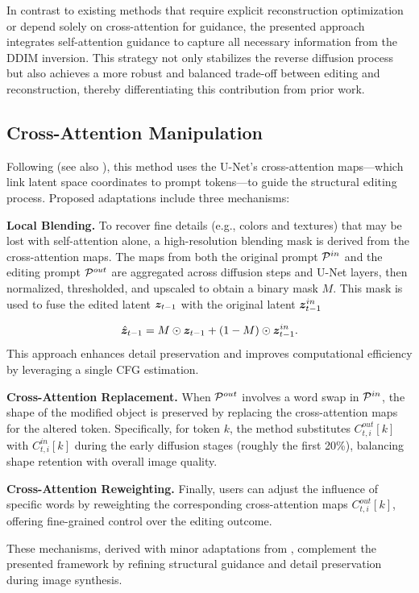 In contrast to existing methods that require explicit reconstruction optimization \cite{mokady2023null,miyake2023negative} or depend solely on cross-attention for guidance, {\modified{}the presented approach integrates} self-attention guidance to capture all necessary information from the DDIM inversion. This strategy not only stabilizes the reverse diffusion process but also achieves a more robust and balanced trade-off between editing and reconstruction, thereby differentiating {\modified{}this contribution} from prior work.




\subsection{Cross-Attention Manipulation}
\label{sec:cross_attention_manipulation}
Following \cite{hertz2023prompt} (see also \cite{mokady2023null,parmar2023zero,han2023proximal,ju2023direct,miyake2023negative}), {\modified{}this method uses} the U-Net’s cross-attention maps—which link latent space coordinates to prompt tokens—to guide the structural editing process. {\modified{}Proposed} adaptations include three mechanisms:


\textbf{Local Blending.} To recover fine details (e.g., colors and textures) that may be lost with self-attention alone, {\modified{}a high-resolution blending mask is derived} from the cross-attention maps. {\modified{}The maps from both the original prompt} ${{\mathcal{P}}^{in}}$ and the editing prompt ${{\mathcal{P}}^{out}}$ {\modified{}are aggregated} across diffusion steps and U-Net layers, then normalized, thresholded, and upscaled to obtain a binary mask $M$. This mask is used to fuse the edited latent ${\bm{z}}_{t-1}$ with the original latent ${\bm{z}}^{in}_{t-1}$

\begin{equation}
    \label{eq:local_blend}
    \hat{{\bm{z}}}_{t-1} = M \odot {\bm{z}}_{t-1} + (1-M) \odot {\bm{z}}^{in}_{t-1}.
\end{equation}
This approach enhances detail preservation and improves computational efficiency by leveraging a single CFG estimation.

\textbf{Cross-Attention Replacement.} When ${{\mathcal{P}}^{out}}$ involves a word swap in ${{\mathcal{P}}^{in}}$, {\modified{}the shape of the modified object is preserved} by replacing the cross-attention maps for the altered token. Specifically, for token $k$, {\modified{}the method substitutes} $C_{t,i}^{out}[k]$ with $C_{t,i}^{in}[k]$ during the early diffusion stages (roughly the first 20\%), balancing shape retention with overall image quality.

\textbf{Cross-Attention Reweighting.} Finally, users can adjust the influence of specific words by reweighting the corresponding cross-attention maps $C_{t,i}^{out}[k]$, offering fine-grained control over the editing outcome.

These mechanisms, derived with minor adaptations from \cite{hertz2023prompt}, complement {\modified{}the presented framework} by refining structural guidance and detail preservation during image synthesis.
